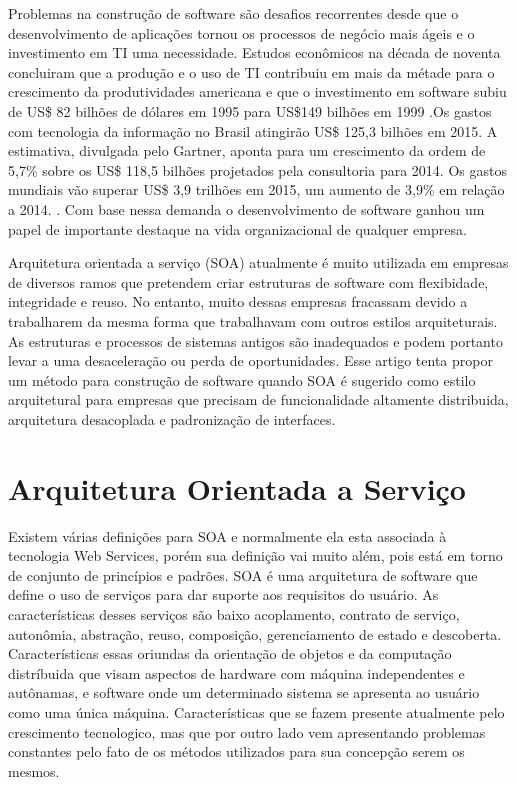 \documentclass[
	article,			%
	11pt,				%
	oneside,			%
	a4paper,			%
	english,			%
	brazil,				%
	sumario=tradicional
	]{abntex2}
\begin{document}
Problemas na construção de software são desafios recorrentes desde que o desenvolvimento de aplicações tornou os processos de negócio mais ágeis e o investimento em TI uma necessidade. Estudos econômicos na década de noventa concluiram que a produção e o uso de TI contribuiu em mais da métade para o crescimento da produtividades americana e que o investimento em software subiu de US\$ 82 bilhões de dólares em 1995 para US\$149 bilhões em 1999 \cite{CynthiaKRiemenschneider2002}.Os gastos com tecnologia da informação no Brasil atingirão US\$ 125,3 bilhões em 2015. A estimativa, divulgada pelo Gartner, aponta para um crescimento da ordem de 5,7\% sobre os US\$ 118,5 bilhões projetados pela consultoria para 2014. Os gastos mundiais vão superar US\$ 3,9 trilhões em 2015, um aumento de 3,9\% em relação a 2014. \cite{ComputerWorld2014}. 
Com base nessa demanda o desenvolvimento de software ganhou um papel de importante destaque na vida organizacional de qualquer empresa.

Arquitetura orientada a serviço (SOA) atualmente é muito utilizada em empresas de diversos ramos que pretendem criar estruturas de software com flexibidade, integridade e reuso. No entanto, muito dessas empresas fracassam devido a trabalharem da mesma forma que trabalhavam com outros estilos arquiteturais. As estruturas e processos de sistemas antigos são inadequados e podem portanto levar a uma desaceleração ou perda de oportunidades\cite{Rothenberger2010}. Esse artigo tenta propor um método para construção de software quando SOA é sugerido como estilo arquitetural para empresas que precisam de funcionalidade altamente distribuida, arquitetura desacoplada e padronização de interfaces.


\newpage
\section{Arquitetura Orientada a Serviço}

Existem várias definições para SOA e normalmente ela esta associada à tecnologia Web Services, porém sua definição vai muito além, pois está em torno de conjunto de princípios e padrões. SOA é uma arquitetura de software que define o uso de serviços para dar suporte aos requisitos do usuário\cite{Lee2006}. As características desses serviços são baixo acoplamento, contrato de serviço, autonômia, abstração, reuso, composição, gerenciamento de estado e descoberta\cite{Erl2005}. Características essas oriundas da orientação de objetos e da computação distríbuida que visam aspectos de hardware com máquina independentes e autônamas, e software onde um determinado sistema se apresenta ao usuário como uma única máquina. Características que se fazem presente atualmente pelo crescimento tecnologico, mas que por outro lado vem apresentando problemas constantes pelo fato de os métodos utilizados para sua concepção serem os mesmos.
\end{document}
